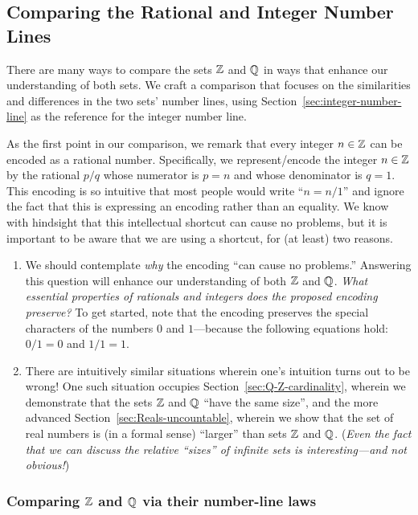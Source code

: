 \subsection{Comparing the Rational and Integer Number Lines}
\label{sec:Compare-Q-Z}

There are many ways to compare the sets $\mathbb{Z}$ and $\mathbb{Q}$ in ways that enhance our understanding of both sets.  We craft a comparison that focuses on the similarities and differences in the two sets' number lines, using Section~\ref{sec:integer-number-line} as the reference for the integer number line.

\smallskip

As the first point in our comparison, we remark that every integer $n \in \mathbb{Z}$ can be encoded as a rational number.  Specifically, we represent/encode the integer $n \in \mathbb{Z}$ by the rational $p/q$ whose numerator is $p = n$ and whose denominator is $q = 1$.  This encoding is so intuitive that most people would write ``$n = n/1$'' and ignore the fact that this is expressing an encoding
rather than an equality.  We know with hindsight that this intellectual shortcut can cause no problems, but it is important to be aware that we are using a shortcut, for (at least) two reasons.
\begin{enumerate}
\item
We should contemplate {\em why} the encoding ``can cause no problems.''  Answering this question will enhance our understanding of both $\mathbb{Z}$ and $\mathbb{Q}$.  {\em What essential properties of rationals and integers does the proposed encoding preserve?}  To get started, note that the encoding preserves the special characters of the numbers $0$ and $1$---because the following equations hold: $0/1 = 0$ and $1/1 = 1$.

\medskip\item
There are intuitively similar situations wherein one's intuition turns out to be wrong!  One such situation occupies Section~\ref{sec:Q-Z-cardinality}, wherein we demonstrate that the
sets $\mathbb{Z}$ and $\mathbb{Q}$ ``have the same size'', and the more advanced Section~\ref{sec:Reals-uncountable}, wherein we show that the set of real numbers is (in a formal sense) ``larger'' than sets $\mathbb{Z}$ and $\mathbb{Q}$.  ({\em Even the fact that we can discuss the relative ``sizes'' of infinite sets is interesting---and not obvious!})
\end{enumerate}

\subsubsection{Comparing $\mathbb{Z}$ and $\mathbb{Q}$ via their number-line laws}
\label{sec:Q-Z-laws}

